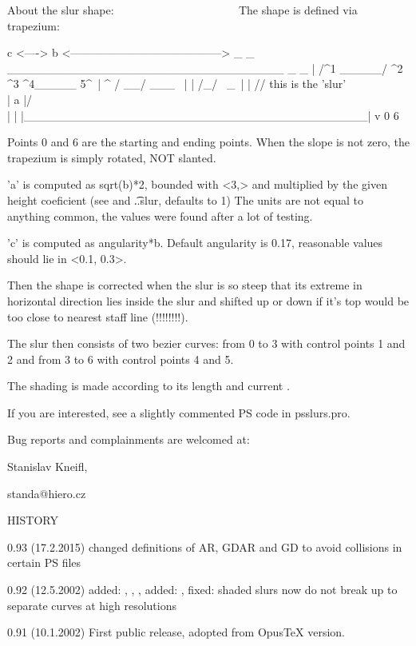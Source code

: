 About the slur shape:
~~~~~~~~~~~~~~~~~~~~~
The shape is defined via trapezium:

       c
    <---->               b
    <----------------------------------------->
     _ _ _________________________________ _ _
    |    /^1 _____/  ^2  ^3  ^4\_____  5^\    | ^
        / __/                        \___ \     |
    |  /_/  \                            \_\  | |
      //     this is the 'slur'            \\   | a
    |/                                      \\| |
    |_________________________________________| v
    0                                         6

Points 0 and 6 are the starting and ending points. When the slope is not
zero, the trapezium is simply rotated, NOT slanted.

'a' is computed as sqrt(b)*2, bounded with <3,\psslurmaxhgt> and multiplied
by the given height coeficient (see \tSlur and \t..slur, defaults to 1)
The units are not equal to anything common, the values were found
after a lot of testing.

'c' is computed as angularity*b. Default angularity is 0.17, reasonable
values should lie in <0.1, 0.3>.

Then the shape is corrected when the slur is so steep that its extreme
in horizontal direction lies inside the slur and shifted up or down
if it's top would be too close to nearest staff line (!!!!!!!!).

The slur then consists of two bezier curves:
from 0 to 3 with control points 1 and 2 and
from 3 to 6 with control points 4 and 5.

The shading is made according to its length and current \internote.



If you are interested, see a slightly commented PS code in psslurs.pro.

Bug reports and complainments are welcomed at:

	Stanislav Kneifl,

	standa@hiero.cz



HISTORY
~~~~~~~

0.93 (17.2.2015)
		changed definitions of AR, GDAR and GD to avoid collisions in certain PS files
		
0.92 (12.5.2002)
      added: \nosluradjust, \sluradjust, \notieadjust, \tieadjust
      added: \slopebrkslurtrue, \slopebrkslurfalse
      fixed: shaded slurs now do not break up to separate curves
             at high resolutions

0.91 (10.1.2002)
     First public release, adopted from OpusTeX version.
